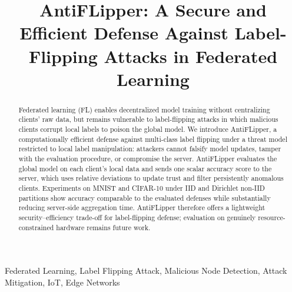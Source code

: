 \documentclass[conference]{IEEEtran}
\begin{document}
\title{AntiFLipper: A Secure and Efficient Defense Against Label-Flipping Attacks in Federated Learning}

\author{

}

\maketitle
\pagestyle{empty}

\begin{abstract}
Federated learning (FL) enables decentralized model training without centralizing clients' raw data, but remains vulnerable to label-flipping attacks in which malicious clients corrupt local labels to poison the global model. We introduce AntiFLipper, a computationally efficient defense against multi-class label flipping under a threat model restricted to local label manipulation: attackers cannot falsify model updates, tamper with the evaluation procedure, or compromise the server. AntiFLipper evaluates the global model on each client's local data and sends one scalar accuracy score to the server, which uses relative deviations to update trust and filter persistently anomalous clients. Experiments on MNIST and CIFAR-10 under IID and Dirichlet non-IID partitions show accuracy comparable to the evaluated defenses while substantially reducing server-side aggregation time. AntiFLipper therefore offers a lightweight security--efficiency trade-off for label-flipping defense; evaluation on genuinely resource-constrained hardware remains future work.
\end{abstract}

\begin{IEEEkeywords}
Federated Learning, Label Flipping Attack, Malicious Node Detection, Attack Mitigation, IoT, Edge Networks
\end{IEEEkeywords}
\end{document}
